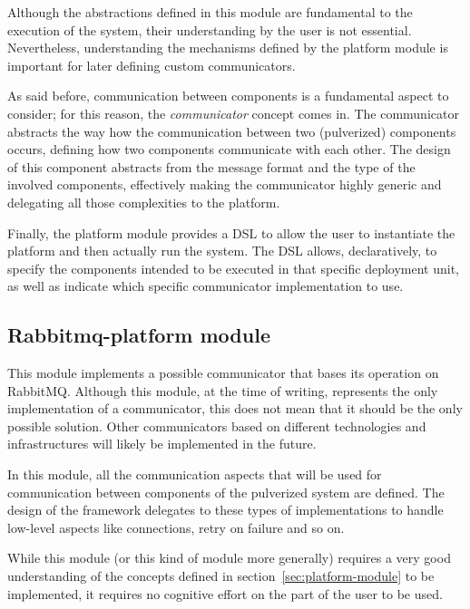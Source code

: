 Although the abstractions defined in this module are fundamental to the execution of the system, their understanding by the user is not essential.
Nevertheless, understanding the mechanisms defined by the platform module is important for later defining custom communicators.

As said before, communication between components is a fundamental aspect to consider; for this reason, the \emph{communicator} concept comes in.
The communicator abstracts the way how the communication between two (pulverized) components occurs, defining how two components communicate with
each other. The design of this component abstracts from the message format and the type of the involved components, effectively making the
communicator highly generic and delegating all those complexities to the platform.

Finally, the platform module provides a DSL to allow the user to instantiate the platform and then actually run the system.
The DSL allows, declaratively, to specify the components intended to be executed in that specific deployment unit, as well as indicate which
specific communicator implementation to use.


\subsection{Rabbitmq-platform module}
\label{sec:rabbitmq-platform-module}

This module implements a possible communicator that bases its operation on RabbitMQ. Although this module, at the time of writing, represents
the only implementation of a communicator, this does not mean that it should be the only possible solution.
Other communicators based on different technologies and infrastructures will likely be implemented in the future.

In this module, all the communication aspects that will be used for communication between components of the pulverized system are defined.
The design of the framework delegates to these types of implementations to handle low-level aspects like connections, retry on failure and so on.

While this module (or this kind of module more generally) requires a very good understanding of the concepts defined in 
section~\ref{sec:platform-module} to be implemented, it requires no cognitive effort on the part of the user to be used.

